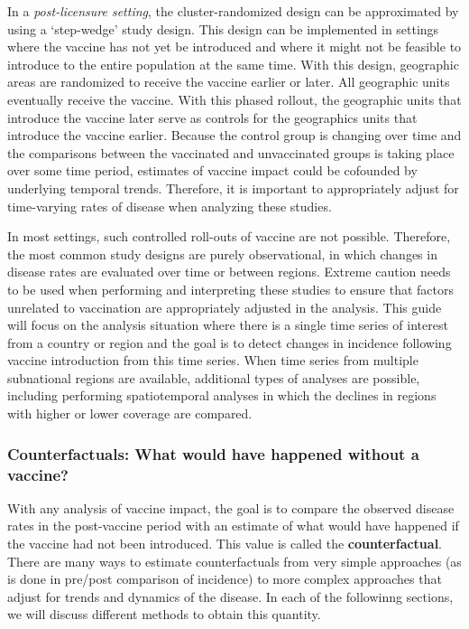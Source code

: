 \documentclass[]{article}
\begin{document}
In a \emph{post-licensure setting}, the cluster-randomized design can be
approximated by using a `step-wedge' study design. This design can be
implemented in settings where the vaccine has not yet be introduced and
where it might not be feasible to introduce to the entire population at
the same time. With this design, geographic areas are randomized to
receive the vaccine earlier or later. All geographic units eventually
receive the vaccine. With this phased rollout, the geographic units that
introduce the vaccine later serve as controls for the geographics units
that introduce the vaccine earlier. Because the control group is
changing over time and the comparisons between the vaccinated and
unvaccinated groups is taking place over some time period, estimates of
vaccine impact could be cofounded by underlying temporal trends.
Therefore, it is important to appropriately adjust for time-varying
rates of disease when analyzing these studies.

In most settings, such controlled roll-outs of vaccine are not possible.
Therefore, the most common study designs are purely observational, in
which changes in disease rates are evaluated over time or between
regions. Extreme caution needs to be used when performing and
interpreting these studies to ensure that factors unrelated to
vaccination are appropriately adjusted in the analysis. This guide will
focus on the analysis situation where there is a single time series of
interest from a country or region and the goal is to detect changes in
incidence following vaccine introduction from this time series. When
time series from multiple subnational regions are available, additional
types of analyses are possible, including performing spatiotemporal
analyses in which the declines in regions with higher or lower coverage
are compared.

\subsubsection{Counterfactuals: What would have happened without a
vaccine?}\label{counterfactuals-what-would-have-happened-without-a-vaccine}

With any analysis of vaccine impact, the goal is to compare the observed
disease rates in the post-vaccine period with an estimate of what would
have happened if the vaccine had not been introduced. This value is
called the \textbf{counterfactual}. There are many ways to estimate
counterfactuals from very simple approaches (as is done in pre/post
comparison of incidence) to more complex approaches that adjust for
trends and dynamics of the disease. In each of the followinng sections,
we will discuss different methods to obtain this quantity.
\end{document}
